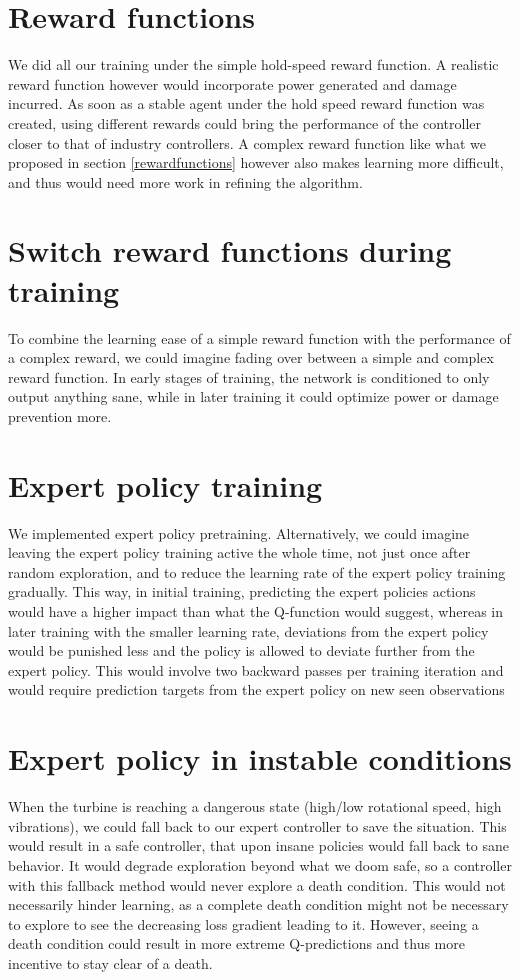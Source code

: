 \documentclass[hyperref,german,beleg]{cgvpub}
\begin{document}
\section{Reward functions}

We did all our training under the simple hold-speed reward function. A realistic reward function however would incorporate power generated and damage incurred. As soon as a stable agent under the hold speed reward function was created, using different rewards could bring the performance of the controller closer to that of industry controllers. A complex reward function like what we proposed in section \ref{rewardfunctions} however also makes learning more difficult, and thus would need more work in refining the algorithm.

\section{Switch reward functions during training}
To combine the learning ease of a simple reward function with the performance of a complex reward, we could imagine fading over between a simple and complex reward function. In early stages of training, the network is conditioned to only output anything sane, while in later training it could optimize power or damage prevention more.


\section{Expert policy training}

We implemented expert policy pretraining. Alternatively, we could imagine leaving the expert policy training active the whole time, not just once after random exploration, and to reduce the learning rate of the expert policy training gradually. This way, in initial training, predicting the expert policies actions would have a higher impact than what the Q-function would suggest, whereas in later training with the smaller learning rate, deviations from the expert policy would be punished less and the policy is allowed to deviate further from the expert policy. This would involve two backward passes per training iteration and would require prediction targets from the expert policy on new seen observations

\section{Expert policy in instable conditions}
When the turbine is reaching a dangerous state (high/low rotational speed, high vibrations), we could fall back to our expert controller to save the situation. This would result in a safe controller, that upon insane policies would fall back to sane behavior. It would degrade exploration beyond what we doom safe, so a controller with this fallback method would never explore a death condition. This would not necessarily hinder learning, as a complete death condition might not be necessary to explore to see the decreasing loss gradient leading to it. However, seeing a death condition could result in more extreme Q-predictions and thus more incentive to stay clear of a death.
\end{document}
